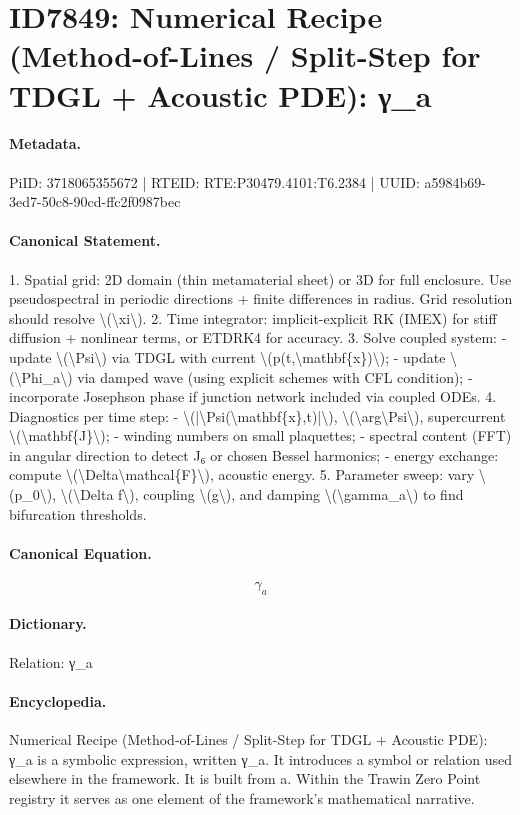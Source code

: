 \section*{ID7849: Numerical Recipe (Method-of-Lines / Split-Step for TDGL + Acoustic PDE): γ\_a}
\paragraph{Metadata.}
PiID: 3718065355672 | RTEID: RTE:P30479.4101:T6.2384 | UUID: a5984b69-3ed7-50c8-90cd-ffc2f0987bec

\paragraph{Canonical Statement.}
1. Spatial grid: 2D domain (thin metamaterial sheet) or 3D for full enclosure. Use pseudospectral in periodic directions + finite differences in radius. Grid resolution should resolve \textbackslash{}(\textbackslash{}xi\textbackslash{}). 2. Time integrator: implicit-explicit RK (IMEX) for stiff diffusion + nonlinear terms, or ETDRK4 for accuracy. 3. Solve coupled system: - update \textbackslash{}(\textbackslash{}Psi\textbackslash{}) via TDGL with current \textbackslash{}(p(t,\textbackslash{}mathbf\{x\})\textbackslash{}); - update \textbackslash{}(\textbackslash{}Phi\_a\textbackslash{}) via damped wave (using explicit schemes with CFL condition); - incorporate Josephson phase if junction network included via coupled ODEs. 4. Diagnostics per time step: - \textbackslash{}(|\textbackslash{}Psi(\textbackslash{}mathbf\{x\},t)|\textbackslash{}), \textbackslash{}(\textbackslash{}arg\textbackslash{}Psi\textbackslash{}), supercurrent \textbackslash{}(\textbackslash{}mathbf\{J\}\textbackslash{}); - winding numbers on small plaquettes; - spectral content (FFT) in angular direction to detect J₆ or chosen Bessel harmonics; - energy exchange: compute \textbackslash{}(\textbackslash{}Delta\textbackslash{}mathcal\{F\}\textbackslash{}), acoustic energy. 5. Parameter sweep: vary \textbackslash{}(p\_0\textbackslash{}), \textbackslash{}(\textbackslash{}Delta f\textbackslash{}), coupling \textbackslash{}(g\textbackslash{}), and damping \textbackslash{}(\textbackslash{}gamma\_a\textbackslash{}) to find bifurcation thresholds.

\paragraph{Canonical Equation.}
\[
\gamma_a
\]

\paragraph{Dictionary.}
Relation: γ\_a

\paragraph{Encyclopedia.}
Numerical Recipe (Method-of-Lines / Split-Step for TDGL + Acoustic PDE): γ\_a is a symbolic expression, written γ\_a. It introduces a symbol or relation used elsewhere in the framework. It is built from a. Within the Trawin Zero Point registry it serves as one element of the framework's mathematical narrative.
